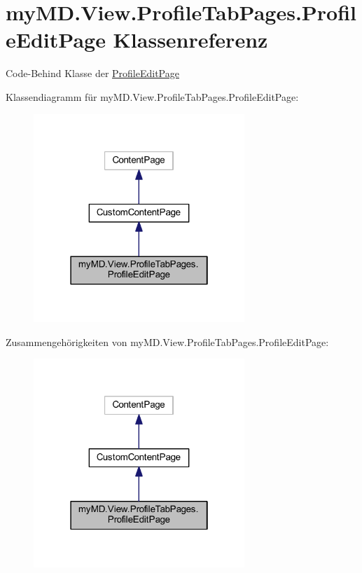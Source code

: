 \hypertarget{classmy_m_d_1_1_view_1_1_profile_tab_pages_1_1_profile_edit_page}{}\section{my\+M\+D.\+View.\+Profile\+Tab\+Pages.\+Profile\+Edit\+Page Klassenreferenz}
\label{classmy_m_d_1_1_view_1_1_profile_tab_pages_1_1_profile_edit_page}


Code-\/\+Behind Klasse der \mbox{\hyperlink{classmy_m_d_1_1_view_1_1_profile_tab_pages_1_1_profile_edit_page}{Profile\+Edit\+Page}}  




Klassendiagramm für my\+M\+D.\+View.\+Profile\+Tab\+Pages.\+Profile\+Edit\+Page\+:
\nopagebreak
\begin{figure}[H]
\begin{center}
\leavevmode
\includegraphics[width=226pt]{classmy_m_d_1_1_view_1_1_profile_tab_pages_1_1_profile_edit_page__inherit__graph}
\end{center}
\end{figure}


Zusammengehörigkeiten von my\+M\+D.\+View.\+Profile\+Tab\+Pages.\+Profile\+Edit\+Page\+:
\nopagebreak
\begin{figure}[H]
\begin{center}
\leavevmode
\includegraphics[width=226pt]{classmy_m_d_1_1_view_1_1_profile_tab_pages_1_1_profile_edit_page__coll__graph}
\end{center}
\end{figure}
